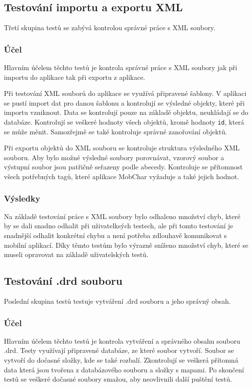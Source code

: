 \documentclass[thesis=B,czech]{resources/FITthesis}[2012/06/26]
\begin{document}
		\subsection{Testování importu a exportu XML}
Třetí skupina testů se zabývá kontrolou správné práce s XML soubory.

			\subsubsection*{Účel}
Hlavním účelem těchto testů je kontrola správné práce s XML soubory jak při importu do aplikace tak při exportu z aplikace. \par

Při testování XML souborů do aplikace se využívá připravené šablony. V aplikaci se pustí import dat pro danou šablonu a kontrolují se výsledné objekty, které při importu vzniknout. Data se kontrolují pouze na základě objektu, neukládají se do databáze. Kontrolují se veškeré hodnoty všech objektů, kromě hodnoty \texttt{id}, která se může měnit. Samozřejmě se také kontroluje správné zanořování objektů. \par

Při exportu objektů do XML souboru se kontroluje struktura výsledného XML souboru. Aby bylo možné výsledné soubory porovnávat, vzorový soubor a výstupní soubor jsou patřičně seřazeny podle abecedy. Kontroluje se přítomnost všech potřebných tagů, které aplikace MobChar vyžaduje a také jejich hodnot.

			\subsubsection*{Výsledky}
Na základě testování práce s XML soubory bylo odhaleno množství chyb, které by se dali snadno odhalit při uživatelksých testech, ale při tomto testování je snadnější odhalit konkrétní chybu a není potřeba zdlouhavě komunikovat s mobilní aplikací. Díky těmto testům bylo výrazně sníženo množství chyb, které se museli opravovat na základě uživatelských testů. 

	\subsection{Testování .drd souboru}
Poslední skupina testů testuje vytváření .drd souboru a jeho správný obsah.

			\subsubsection*{Účel}
Hlavním účelem těchto testů je kontrola vytváření a správného obsahu souboru .drd. Testy využívají připravené databáze, ze které soubor vytvoří. Soubor se vytvoří do dočasné složky, kde se také rozbalí. Zkontrolují se veškerá přítomná data která jsou tvořena z databázového souboru a složky s mapami. Po skončení testů se veškeré dočasné soubory smažou, aby neovlivnili další puštění testů.
\end{document}
